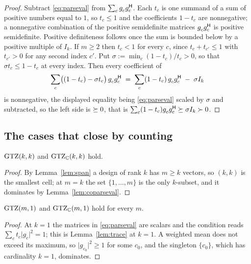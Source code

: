 \begin{proof}
Subtract \eqref{eq:parseval} from $\sum_c g_c^{\vphantom{\mathsf{H}}}g_c\adj$.
Each $t_c$ is one summand of a sum of positive numbers equal to $1$, so
$t_c\le1$ and the coefficients $1-t_c$ are nonnegative; a nonnegative
combination of the positive semidefinite matrices
$g_c^{\vphantom{\mathsf{H}}}g_c\adj$ is positive semidefinite.  Positive
definiteness follows once the sum is bounded below by a positive multiple
of $I_k$.  If $m\ge2$ then $t_c<1$ for every $c$, since
$t_c+t_{c'}\le1$ with $t_{c'}>0$ for any second index $c'$.  Put
$\sigma:=\min_c(1-t_c)/t_c>0$, so that $\sigma t_c\le1-t_c$ at every
index.  Then every coefficient of
\[
  \sum_c\bigl((1-t_c)-\sigma t_c\bigr)\,g_c^{\vphantom{\mathsf{H}}}g_c\adj
  \;=\;\sum_c(1-t_c)\,g_c^{\vphantom{\mathsf{H}}}g_c\adj\;-\;\sigma I_k
\]
is nonnegative, the displayed equality being \eqref{eq:parseval} scaled by
$\sigma$ and subtracted, so the left side is $\succeq0$, that is
$\sum_c(1-t_c)g_c^{\vphantom{\mathsf{H}}}g_c\adj\psd\sigma I_k\pd0$.
\end{proof}

\subsection{The cases that close by counting}

\begin{proposition}[Lean]\label{prop:sizerank}
$\mathrm{GTZ}(k,k)$ and $\mathrm{GTZ}_{\mathbb{C}}(k,k)$ hold.
\end{proposition}

\begin{proof}
By Lemma~\ref{lem:span} a design of rank $k$ has $m\ge k$ vectors, so
$(k,k)$ is the smallest cell; at $m=k$ the set $\{1,\dots,m\}$ is the
only $k$-subset, and it dominates by Lemma~\ref{lem:coparseval}.
\end{proof}

\begin{proposition}[Lean]\label{prop:rankone}
$\mathrm{GTZ}(m,1)$ and $\mathrm{GTZ}_{\mathbb{C}}(m,1)$ hold for every $m$.
\end{proposition}

\begin{proof}
At $k=1$ the matrices in \eqref{eq:parseval} are scalars and the
condition reads $\sum_c t_c\lvert g_c\rvert^2=1$; this is
Lemma~\ref{lem:trace} at $k=1$.  A weighted mean does not exceed its
maximum, so $\lvert g_{c_0}\rvert^2\ge1$ for some $c_0$, and the
singleton $\{c_0\}$, which has cardinality $k=1$, dominates.
\end{proof}

